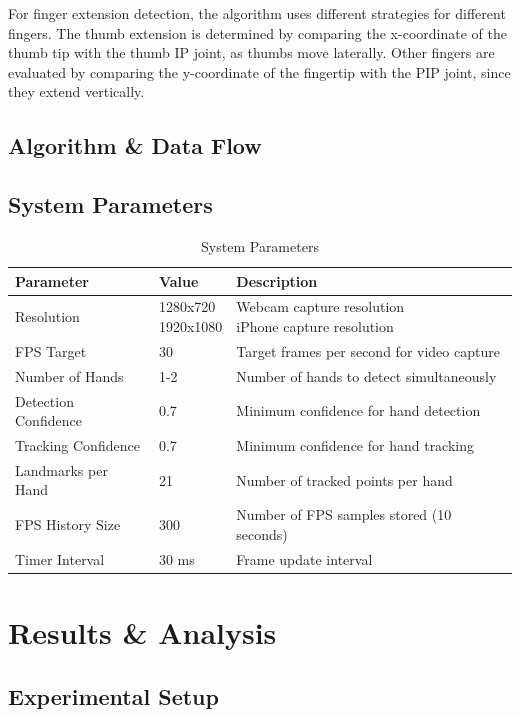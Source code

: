 \documentclass{article}
\begin{document}
For finger extension detection, the algorithm uses different strategies for different fingers. The thumb extension is determined by comparing the x-coordinate of the thumb tip with the thumb IP joint, as thumbs move laterally. Other fingers are evaluated by comparing the y-coordinate of the fingertip with the PIP joint, since they extend vertically.

\subsection{Algorithm \& Data Flow}

\subsection{System Parameters}

\begin{table}[H]
	\centering
	\begin{tabular}{|l|l|l|}
		\hline
		\textbf{Parameter} & \textbf{Value} & \textbf{Description} \\\hline
		Resolution & \makecell[l]{1280x720\\1920x1080} & \makecell[l]{Webcam capture resolution\\iPhone capture resolution} \\\hline
		FPS Target & 30 & Target frames per second for video capture \\\hline
		Number of Hands & 1-2 & Number of hands to detect simultaneously \\\hline
		Detection Confidence & 0.7 & Minimum confidence for hand detection \\\hline
		Tracking Confidence & 0.7 & Minimum confidence for hand tracking \\\hline
		Landmarks per Hand & 21 & Number of tracked points per hand \\\hline
		FPS History Size & 300 & Number of FPS samples stored (10 seconds) \\\hline
		Timer Interval & 30 ms & Frame update interval \\\hline
	\end{tabular}
	\caption{System Parameters}
\end{table}

\section{Results \& Analysis}

\subsection{Experimental Setup}
\end{document}
